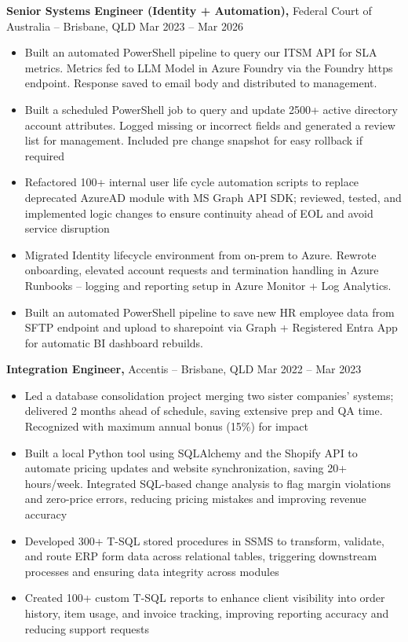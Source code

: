 \documentclass[11pt]{article}       %
\begin{document}
\textbf{Senior Systems Engineer (Identity + Automation),} {Federal Court of Australia} -- Brisbane, QLD \hfill Mar 2023 -- Mar 2026 \\
\vspace{-9pt}
\begin{itemize}

  \item Built an automated PowerShell pipeline to query our ITSM API for SLA metrics. Metrics fed to LLM Model in Azure Foundry via the Foundry https endpoint. Response saved to email body and distributed to management.
  \item Built a scheduled PowerShell job to query and update 2500+ active directory account attributes. Logged missing or incorrect fields and generated a review list for management. Included pre change snapshot for easy rollback if required
  \item Refactored 100+ internal user life cycle automation scripts to replace deprecated AzureAD module with MS Graph API SDK; reviewed, tested, and implemented logic changes to ensure continuity ahead of EOL and avoid service disruption
  \item Migrated Identity lifecycle environment from on-prem to Azure. Rewrote onboarding, elevated account requests and termination handling in Azure Runbooks -- logging and reporting setup in Azure Monitor + Log Analytics.
  \item Built an automated PowerShell pipeline to save new HR employee data from SFTP endpoint and upload to sharepoint via Graph + Registered Entra App for automatic BI dashboard rebuilds.

\end{itemize}

\textbf{Integration Engineer,} {Accentis} -- Brisbane, QLD \hfill Mar 2022 -- Mar 2023 \\
\vspace{-9pt}
\begin{itemize}

  \item Led a database consolidation project merging two sister companies’ systems; delivered 2 months ahead of schedule, saving extensive prep and QA time. Recognized with maximum annual bonus (15\%) for impact
  \item Built a local Python tool using SQLAlchemy and the Shopify API to automate pricing updates and website synchronization, saving 20+ hours/week. Integrated SQL-based change analysis to flag margin violations and zero-price errors, reducing pricing mistakes and improving revenue accuracy
  \item Developed 300+ T-SQL stored procedures in SSMS to transform, validate, and route ERP form data across relational tables, triggering downstream processes and ensuring data integrity across modules
  \item Created 100+ custom T-SQL reports to enhance client visibility into order history, item usage, and invoice tracking, improving reporting accuracy and reducing support requests
\end{itemize}
\end{document}
